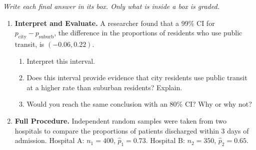 \documentclass[10pt]{article}
\begin{document}
{\small\itshape Write each final answer in its box. Only what is inside a box is graded.}\par

\vspace{0.15in}

\begin{enumerate}

\item \textbf{Interpret and Evaluate.} A researcher found that a 99\% CI for
$p_{\text{city}} - p_{\text{suburb}}$, the difference in the proportions of residents
who use public transit, is $(-0.06, 0.22)$.

\begin{enumerate}[label=\alph*.]
  \item Interpret this interval. 
  \item Does this interval provide evidence that city residents use public transit at a
        higher rate than suburban residents? Explain. 
  \item Would you reach the same conclusion with an 80\% CI? Why or why not?
\end{enumerate}

\newpage
\item \textbf{Full Procedure.} Independent random samples were taken from two
hospitals to compare the proportions of patients discharged within 3 days of admission.
Hospital A: $n_1=400$, $\hat p_1 = 0.73$. Hospital B: $n_2=350$, $\hat p_2 = 0.65$.


\end{enumerate}
\end{document}

